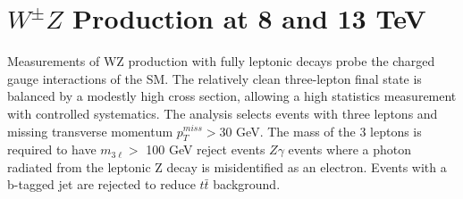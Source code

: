 \documentclass[10pt]{article}
\begin{document}
\section{$W^{\pm}Z$ Production at 8 and 13 TeV}

Measurements of WZ production with fully leptonic decays probe the charged
gauge interactions of the SM. The relatively clean three-lepton final state
is balanced by a modestly high cross section, allowing a high statistics measurement 
with controlled systematics. The analysis selects events with three leptons and 
missing transverse momentum $p_{T}^{miss} > 30$ GeV. The mass of the 3 leptons
is required to have $m_{3\ell} > $ 100 GeV reject events $Z\gamma$ events where a photon
radiated from the leptonic Z decay is misidentified as an electron. Events with
a b-tagged jet are rejected to reduce $t\bar{t}$ background.
\end{document}
